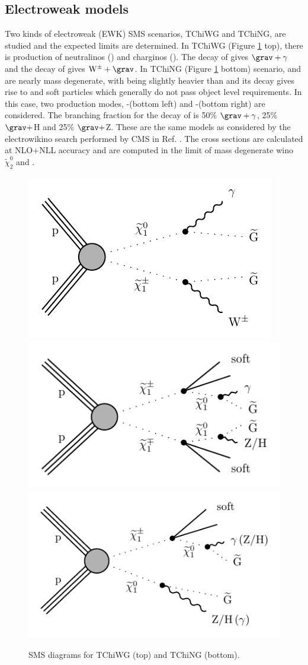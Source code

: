 \subsection{Electroweak models}
Two kinds of electroweak (EWK) SMS scenarios, TChiWG and TChiNG, are studied and the expected limits are determined.
In TChiWG (Figure \ref{fig:CMS-SUS-16-046_Figure_001} top), there is production of neutralinos (\PSGczDo) and charginos (\PSGczDq).
The decay of \PSGczDo gives $\grav + \gamma$ and the decay of \PSGczDq gives $\mathrm{W^\pm}+\grav$. In TChiNG (Figure \ref{fig:CMS-SUS-16-046_Figure_001} bottom) scenario, \PSGczDq and \PSGczDo are nearly mass degenerate, with \PSGczDq being slightly
heavier than \PSGczDo and its decay gives rise to \PSGczDo and soft particles which generally do not pass object level requirements. In this case, two production modes, \PSGczDq-\PSGczDq (bottom left) and \PSGczDq-\PSGczDo (bottom right) are considered. The branching fraction for the decay of \PSGczDo is 50\% $\grav + \gamma$, 25\% $\grav + $H and 25\% $\grav +$Z. These are the same models as considered by the electrowikino search performed by CMS in Ref. \cite{Sirunyan:2017nyt}. The cross sections are calculated at NLO+NLL accuracy \cite{Fuks:2013vua,Fuks:2012qx,Beenakker:1999xh} and are computed in the limit of mass degenerate wino $\tilde{\chi}_{2}^{0}$ and \PSGczDq.
\begin{figure}[h!]
\centering
\includegraphics[width=0.48\linewidth]{../Figures/Chap4/CMS-SUS-16-046_Figure_001-b}\\
\includegraphics[width=0.48\linewidth]{../Figures/Chap4/CMS-SUS-16-046_Figure_001-c}
\includegraphics[width=0.48\linewidth]{../Figures/Chap4/CMS-SUS-16-046_Figure_001-d}
\caption[TChiWG and TChiNG SMS digrams]{SMS diagrams for TChiWG (top) and TChiNG (bottom).}
\label{fig:CMS-SUS-16-046_Figure_001}
\end{figure}

